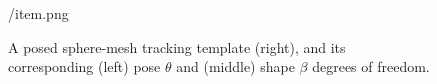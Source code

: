 \begin{figure}[b]
\centering
\begin{overpic} 
[width=\linewidth]
{\currfiledir/item.png}
\myfigurename{}
\end{overpic}
\caption{
% 
A posed sphere-mesh tracking template (right), and its corresponding (left) pose $\theta$ and (middle) shape $\beta$ degrees of freedom. 
% 
}
\label{fig:handmodel}
\end{figure}
